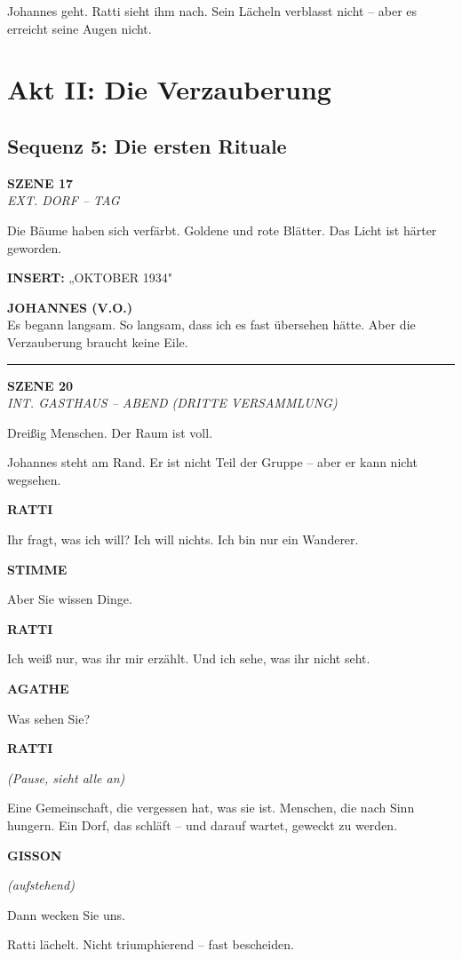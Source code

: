 \documentclass[11pt,a4paper,twoside]{book}
\newcommand{\szene}[2]{%
    \vspace{1em}
    \noindent\textbf{\textsf{#1}}\\
    \textit{#2}
    \vspace{0.5em}
}
\newcommand{\figur}[1]{%
    \vspace{0.5em}
    \noindent\hspace{3cm}\textbf{\MakeUppercase{#1}}\\
    \hspace{3cm}
}
\newcommand{\regieanweisung}[1]{%
    \textit{(#1)}
}
\newcommand{\voiceover}[1]{%
    \begin{voiceoverbox}
    \textbf{JOHANNES (V.O.)}\\
    #1
    \end{voiceoverbox}
}
\begin{document}
Johannes geht. Ratti sieht ihm nach. Sein Lächeln verblasst nicht -- aber es erreicht seine Augen nicht.


\chapter{Akt II: Die Verzauberung}

\section*{Sequenz 5: Die ersten Rituale}

\szene{SZENE 17}{EXT. DORF -- TAG}

Die Bäume haben sich verfärbt. Goldene und rote Blätter. Das Licht ist härter geworden.

\textbf{INSERT:} „OKTOBER 1934"

\voiceover{Es begann langsam. So langsam, dass ich es fast übersehen hätte. Aber die Verzauberung braucht keine Eile.}

\vspace{1em}
\hrule
\vspace{1em}

\szene{SZENE 20}{INT. GASTHAUS -- ABEND (DRITTE VERSAMMLUNG)}

Dreißig Menschen. Der Raum ist voll.

Johannes steht am Rand. Er ist nicht Teil der Gruppe -- aber er kann nicht wegsehen.

\begin{dialogbox}
\figur{Ratti}
Ihr fragt, was ich will? Ich will nichts. Ich bin nur ein Wanderer.

\figur{Stimme}
Aber Sie wissen Dinge.

\figur{Ratti}
Ich weiß nur, was ihr mir erzählt. Und ich sehe, was ihr nicht seht.

\figur{Agathe}
Was sehen Sie?

\figur{Ratti}
\regieanweisung{Pause, sieht alle an}
Eine Gemeinschaft, die vergessen hat, was sie ist. Menschen, die nach Sinn hungern. Ein Dorf, das schläft -- und darauf wartet, geweckt zu werden.

\figur{Gisson}
\regieanweisung{aufstehend}
Dann wecken Sie uns.
\end{dialogbox}

Ratti lächelt. Nicht triumphierend -- fast bescheiden.
\end{document}

